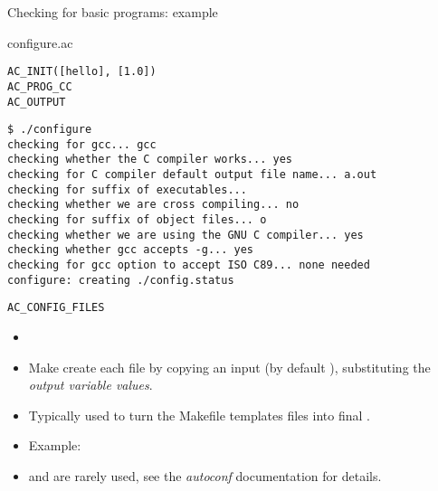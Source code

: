 \begin{frame}[fragile]{Checking for basic programs: example}

\begin{block}{configure.ac}
\begin{verbatim}
AC_INIT([hello], [1.0])
AC_PROG_CC
AC_OUTPUT
\end{verbatim}
\end{block}

\begin{block}{}
\begin{verbatim}
$ ./configure
checking for gcc... gcc
checking whether the C compiler works... yes
checking for C compiler default output file name... a.out
checking for suffix of executables...
checking whether we are cross compiling... no
checking for suffix of object files... o
checking whether we are using the GNU C compiler... yes
checking whether gcc accepts -g... yes
checking for gcc option to accept ISO C89... none needed
configure: creating ./config.status
\end{verbatim}
\end{block}

\end{frame}

\begin{frame}{{\tt AC\_CONFIG\_FILES}}
  \begin{itemize}
  \item {}
  \item Make  create each file by copying an input
     (by default ), substituting the {\em
      output variable values}.
  \item Typically used to turn the Makefile templates
     files into final .
  \item Example:\\
  \item {} and  are rarely used, see the {\em
      autoconf} documentation for details.
  \end{itemize}
\end{frame}

